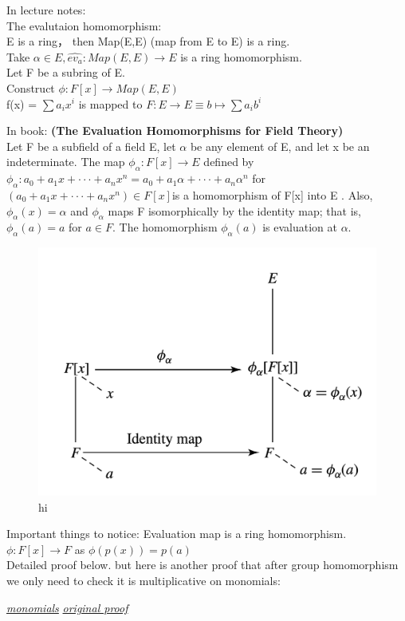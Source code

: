 \documentclass{article}
\begin{document}
\begin{Def}
In lecture notes:
    \\The evalutaion homomorphism:
    \\E is a ring， then Map(E,E) (map from E to E) is a ring. 
    \\Take $\alpha \in E, \hat{ev_a} : Map(E,E) \rightarrow E $ is a ring homomorphism. 
    \\Let F be a subring of E.
    \\Construct $\phi: F[x]\rightarrow Map(E,E)$
    \\ f(x) = $\sum a_i x^i$ is mapped to $F:E\rightarrow E \equiv b\mapsto \sum a_ib^i$
\end{Def}
\begin{Def}
    In book:
\textbf{(The Evaluation Homomorphisms for Field Theory)}
\\Let F be a subfield of a field E, let $\alpha$ be any element of E, and let x be an indeterminate. The map $\phi_\alpha: F[x] \rightarrow E$  defined by
$\phi_\alpha: a_0+a_1x+···+a_nx^n =a_0+a_1\alpha+···+a_n\alpha^n$ for $(a_0 + a_1x + · · · + a_nx^n )\in F[x] $is a homomorphism of F[x] into E . Also, $\phi_\alpha(x) = \alpha$ and $\phi_\alpha$ maps F isomorphically by the identity map; that is,$ \phi_\alpha(a) = a$ for $a \in F$. The homomorphism $ \phi_\alpha(a)$ is evaluation at $\alpha$.

\begin{figure}
    \centering
    \includegraphics[width=0.5\linewidth]{Screenshot 2023-11-27 at 12.39.20 AM.png}
    \caption{hi}
    \label{fig:enter-label}
\end{figure}

\end{Def}
\begin{note}
    Important things to notice: Evaluation map is a ring homomorphism. 
    \\ $\phi: F[x] \rightarrow F$ as $\phi(p(x)) = p(a)$
    \\Detailed proof below. but here is another proof that after group homomorphism we only need to check it is multiplicative on monomials:
    
\textit{    \href{https://math.stackexchange.com/questions/3825249/showing-in-multiplicative-property-of-ring-homomorphism-in-proof-that-evaluation}{monomials}}
\textit{    \href{https://math.stackexchange.com/questions/935877/how-to-prove-that-the-evaluation-map-is-a-ring-homomorphism}{original proof}}

\end{note}
\end{document}
